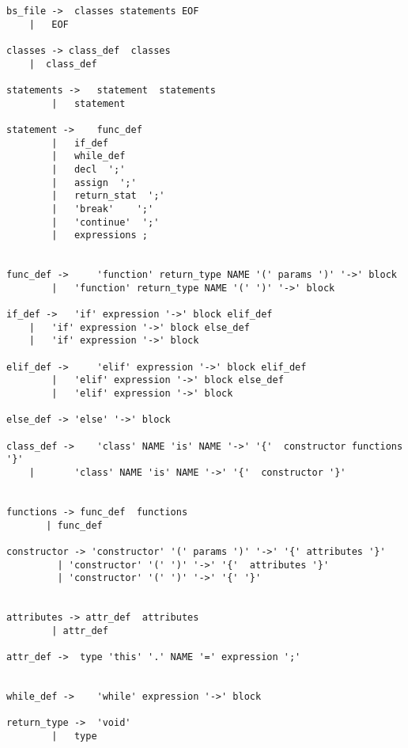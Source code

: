 \begin{verbatim}
bs_file ->  classes statements EOF     
    |   EOF                       

classes -> class_def  classes         
    |  class_def                       

statements ->   statement  statements      
        |   statement                       

statement ->    func_def
        |   if_def
        |   while_def
        |   decl  ';' 
        |   assign  ';' 
        |   return_stat  ';' 
        |   'break'    ';'                        
        |   'continue'  ';'                       
        |   expressions ;


func_def ->     'function' return_type NAME '(' params ')' '->' block       
        |   'function' return_type NAME '(' ')' '->' block              

if_def ->   'if' expression '->' block elif_def                             
    |   'if' expression '->' block else_def                             
    |   'if' expression '->' block                                      

elif_def ->     'elif' expression '->' block elif_def                       
        |   'elif' expression '->' block else_def                       
        |   'elif' expression '->' block                                

else_def -> 'else' '->' block                                               

class_def ->    'class' NAME 'is' NAME '->' '{'  constructor functions '}'   
    |       'class' NAME 'is' NAME '->' '{'  constructor '}'                     


functions -> func_def  functions                     
       | func_def                                

constructor -> 'constructor' '(' params ')' '->' '{' attributes '}'              
         | 'constructor' '(' ')' '->' '{'  attributes '}'                 
         | 'constructor' '(' ')' '->' '{' '}'                   


attributes -> attr_def  attributes             
        | attr_def                         

attr_def ->  type 'this' '.' NAME '=' expression ';'          


while_def ->    'while' expression '->' block              

return_type ->  'void'                        
        |   type                          


\end{verbatim}
